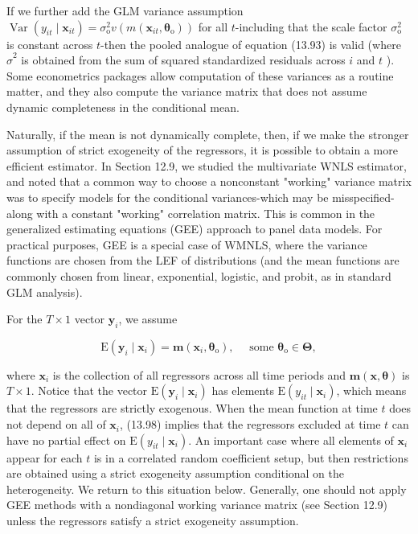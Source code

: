 \documentclass[10pt]{article}
\begin{document}
If we further add the GLM variance assumption $\operatorname{Var}\left(y_{i t} \mid \mathbf{x}_{i t}\right)=\sigma_{\mathrm{o}}^{2} v\left(m\left(\mathbf{x}_{i t}, \boldsymbol{\theta}_{\mathrm{o}}\right)\right)$ for all $t$-including that the scale factor $\sigma_{\mathrm{o}}^{2}$ is constant across $t$-then the pooled analogue of equation (13.93) is valid (where $\hat{\sigma}^{2}$ is obtained from the sum of squared standardized residuals across $i$ and $t$ ). Some econometrics packages allow computation of these variances as a routine matter, and they also compute the variance matrix that does not assume dynamic completeness in the conditional mean.

Naturally, if the mean is not dynamically complete, then, if we make the stronger assumption of strict exogeneity of the regressors, it is possible to obtain a more efficient estimator. In Section 12.9, we studied the multivariate WNLS estimator, and noted that a common way to choose a nonconstant "working" variance matrix was to specify models for the conditional variances-which may be misspecified-along with a constant "working" correlation matrix. This is common in the generalized estimating equations (GEE) approach to panel data models. For practical purposes, GEE is a special case of WMNLS, where the variance functions are chosen from the LEF of distributions (and the mean functions are commonly chosen from linear, exponential, logistic, and probit, as in standard GLM analysis).

For the $T \times 1$ vector $\mathbf{y}_{i}$, we assume


\begin{equation*}
\mathrm{E}\left(\mathbf{y}_{i} \mid \mathbf{x}_{i}\right)=\mathbf{m}\left(\mathbf{x}_{i}, \boldsymbol{\theta}_{\mathrm{o}}\right), \quad \text { some } \boldsymbol{\theta}_{\mathrm{o}} \in \boldsymbol{\Theta}, \tag{13.98}
\end{equation*}


where $\mathbf{x}_{i}$ is the collection of all regressors across all time periods and $\mathbf{m}(\mathbf{x}, \boldsymbol{\theta})$ is $T \times 1$. Notice that the vector $\mathrm{E}\left(\mathbf{y}_{i} \mid \mathbf{x}_{i}\right)$ has elements $\mathrm{E}\left(y_{i t} \mid \mathbf{x}_{i}\right)$, which means that the regressors are strictly exogenous. When the mean function at time $t$ does not depend on all of $\mathbf{x}_{i}$, (13.98) implies that the regressors excluded at time $t$ can have no partial effect on $\mathrm{E}\left(y_{i t} \mid \mathbf{x}_{i}\right)$. An important case where all elements of $\mathbf{x}_{i}$ appear for each $t$ is in a correlated random coefficient setup, but then restrictions are obtained using a strict exogeneity assumption conditional on the heterogeneity. We return to this situation below. Generally, one should not apply GEE methods with a nondiagonal working variance matrix (see Section 12.9) unless the regressors satisfy a strict exogeneity assumption.
\end{document}
